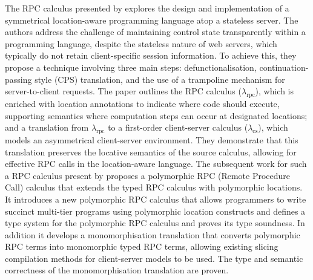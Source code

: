 The RPC calculus presented by \citet{cooper2009rpc} explores the design and implementation of a symmetrical location-aware programming language atop a stateless server. The authors address the challenge of maintaining control state transparently within a programming language, despite the stateless nature of web servers, which typically do not retain client-specific session information.
To achieve this, they propose a technique involving three main steps: defunctionalisation, continuation-passing style (CPS) translation, and the use of a trampoline mechanism for server-to-client requests. The paper outlines the RPC calculus ($\lambda_{\text{rpc}}$), which is enriched with location annotations to indicate where code should execute, supporting semantics where computation steps can occur at designated locations; and a translation from $\lambda_{\text{rpc}}$ to a first-order client-server calculus ($\lambda_{\text{cs}}$), which models an asymmetrical client-server environment. They demonstrate that this translation preserves the locative semantics of the source calculus, allowing for effective RPC calls in the location-aware language. The subsequent work for such a RPC calculus present by \citep{choi2020polymorphic} proposes a polymorphic RPC (Remote Procedure Call) calculus that extends the typed RPC calculus with polymorphic locations. It introduces a new polymorphic RPC calculus that allows programmers to write succinct multi-tier programs using polymorphic location constructs and defines a type system for the polymorphic RPC calculus and proves its type soundness. In addition it develops a monomorphisation translation that converts polymorphic RPC terms into monomorphic typed RPC terms, allowing existing slicing compilation methods for client-server models to be used. The type and semantic correctness of the monomorphisation translation are proven.

